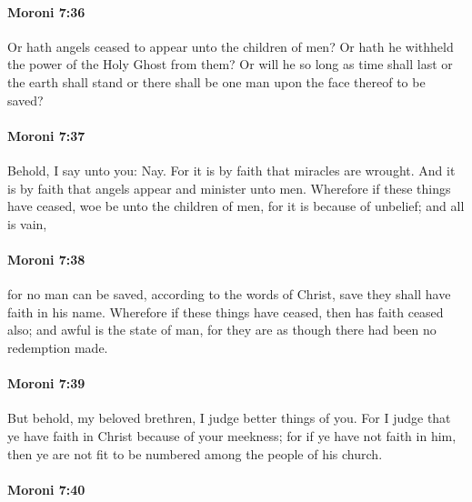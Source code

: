 		\paragraph{Moroni 7:36} %
			\label{MORONI-7-36}

			Or hath angels ceased to appear unto the children of men?
			Or hath he withheld the power of the Holy Ghost from them?
			Or will he so long as time shall last or the earth shall stand
			or there shall be one man upon the face thereof to be saved?

		\paragraph{Moroni 7:37} %
			\label{MORONI-7-37}

			Behold, I say unto you: Nay.
			For it is by faith that miracles are wrought.
			And it is by faith that angels appear and minister unto men.
			Wherefore if these things have ceased,
			woe be unto the children of men,
			for it is because of unbelief;
			and all is vain,

		\paragraph{Moroni 7:38} %
			\label{MORONI-7-38}

			for no man can be saved,
			according to the words of Christ,
			save they shall have faith in his name.
			Wherefore if these things have ceased,
			then has faith ceased also;
			and awful is the state of man,
			for they are as though there had been no redemption made.

		\paragraph{Moroni 7:39} %
			\label{MORONI-7-39}

			But behold, my beloved brethren, I judge better things of you.
			For I judge that ye have faith in Christ because of your meekness;
			for if ye have not faith in him,
			then ye are not fit to be numbered among the people of his church.

		\paragraph{Moroni 7:40} %
			\label{MORONI-7-40}


